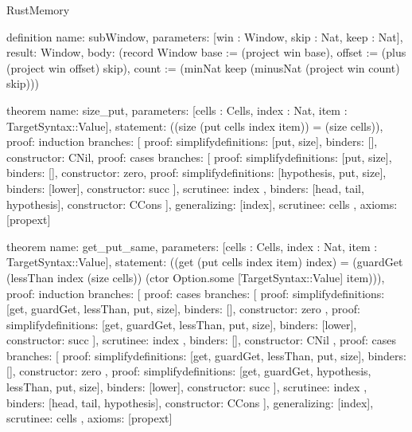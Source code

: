 \begin{lexlean}{RustMemory}
\begin{semanticmodule}
definition{
  name: subWindow,
  parameters: [win : Window, skip : Nat, keep : Nat],
  result: Window,
  body: (record Window {base := (project win base), offset := (plus (project win offset) skip), count := (minNat keep (minusNat (project win count) skip))})
}

theorem{
  name: size_put,
  parameters: [cells : Cells, index : Nat, item : TargetSyntax::Value],
  statement: ((size (put cells index item)) = (size cells)),
  proof: induction{
    branches: [
      {proof: simplify{definitions: [put, size]}, binders: [], constructor: CNil},
      {
        proof: cases{
          branches: [
            {proof: simplify{definitions: [put, size]}, binders: [], constructor: zero},
            {
              proof: simplify{definitions: [hypothesis, put, size]},
              binders: [lower],
              constructor: succ
            }
          ],
          scrutinee: index
        },
        binders: [head, tail, hypothesis],
        constructor: CCons
      }
    ],
    generalizing: [index],
    scrutinee: cells
  },
  axioms: [propext]
}

theorem{
  name: get_put_same,
  parameters: [cells : Cells, index : Nat, item : TargetSyntax::Value],
  statement: ((get (put cells index item) index) = (guardGet (lessThan index (size cells)) (ctor Option.some [TargetSyntax::Value] item))),
  proof: induction{
    branches: [
      {
        proof: cases{
          branches: [
            {
              proof: simplify{definitions: [get, guardGet, lessThan, put, size]},
              binders: [],
              constructor: zero
            },
            {
              proof: simplify{definitions: [get, guardGet, lessThan, put, size]},
              binders: [lower],
              constructor: succ
            }
          ],
          scrutinee: index
        },
        binders: [],
        constructor: CNil
      },
      {
        proof: cases{
          branches: [
            {
              proof: simplify{definitions: [get, guardGet, lessThan, put, size]},
              binders: [],
              constructor: zero
            },
            {
              proof: simplify{definitions: [get, guardGet, hypothesis, lessThan, put, size]},
              binders: [lower],
              constructor: succ
            }
          ],
          scrutinee: index
        },
        binders: [head, tail, hypothesis],
        constructor: CCons
      }
    ],
    generalizing: [index],
    scrutinee: cells
  },
  axioms: [propext]
}


\end{semanticmodule}
\end{lexlean}
